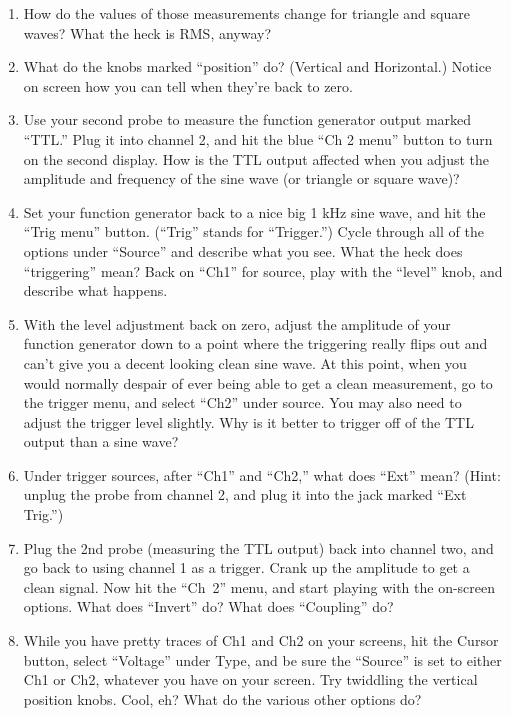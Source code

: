 \begin{enumerate}[wide]
\item How do the values of those measurements change for triangle and square waves?  What the heck is RMS, anyway?

\item What do the knobs marked ``position'' do?  (Vertical and Horizontal.)  Notice on screen how you can tell when they're back to zero. 

\item Use your second probe to measure the function generator output marked ``TTL.'' Plug it into channel 2, and hit the blue ``Ch 2 menu'' button to turn on the second display.  How is the TTL output affected when you adjust the amplitude and frequency of the sine wave (or triangle or square wave)?

\item Set your function generator back to a nice big 1 kHz sine wave, and hit the ``Trig menu'' button.  (``Trig'' stands for ``Trigger.'')  Cycle through all of the options under ``Source'' and describe what you see.  What the heck does ``triggering'' mean?  Back on ``Ch1'' for source, play with the ``level'' knob, and describe what happens.

\item With the level adjustment back on zero, adjust the amplitude of your function generator down to a point where the triggering really flips out and can't give you a decent looking clean sine wave.   At this point, when you would normally despair of ever being able to get a clean measurement, go to the trigger menu, and select ``Ch2'' under source.  You may also need to adjust the trigger level slightly.  Why is it better to trigger off of the TTL output than a sine wave?

\item Under trigger sources, after ``Ch1'' and ``Ch2,'' what does ``Ext'' mean?  (Hint: unplug the probe from channel 2, and plug it into the jack marked ``Ext Trig.'')  

\item Plug the 2nd probe (measuring the TTL output) back into channel two, and go back to using channel 1 as a trigger.  Crank up the amplitude to get a clean signal.  Now hit the ``Ch~2'' menu, and start playing with the on-screen options.   What does ``Invert'' do?  What does ``Coupling'' do? 

\item While you have pretty traces of Ch1 and Ch2 on your screens, hit the Cursor button, select ``Voltage'' under Type, and be sure the ``Source'' is set to either Ch1 or Ch2, whatever you have on your screen.  Try twiddling the vertical position knobs.  Cool, eh?  What do the various other options do?


\end{enumerate}

